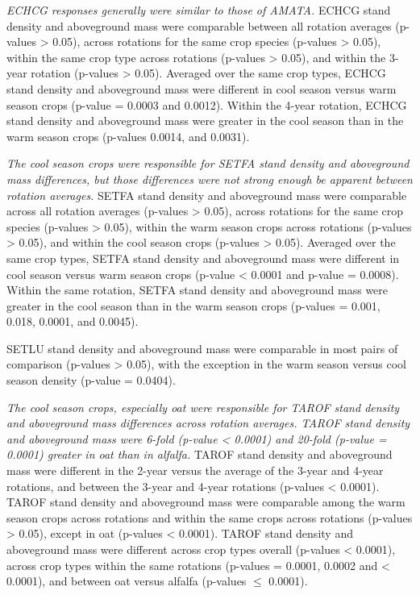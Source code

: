 \documentclass[
]{article}
\begin{document}
\emph{ECHCG responses generally were similar to those of AMATA.} ECHCG stand density and aboveground mass were comparable between all rotation averages (p-values \textgreater{} 0.05), across rotations for the same crop species (p-values \textgreater{} 0.05), within the same crop type across rotations (p-values \textgreater{} 0.05), and within the 3-year rotation (p-values \textgreater{} 0.05). Averaged over the same crop types, ECHCG stand density and aboveground mass were different in cool season versus warm season crops (p-value = 0.0003 and 0.0012). Within the 4-year rotation, ECHCG stand density and aboveground mass were greater in the cool season than in the warm season crops (p-values 0.0014, and 0.0031).

\emph{The cool season crops were responsible for SETFA stand density and aboveground mass differences, but those differences were not strong enough be apparent between rotation averages.} SETFA stand density and aboveground mass were comparable across all rotation averages (p-values \textgreater{} 0.05), across rotations for the same crop species (p-values \textgreater{} 0.05), within the warm season crops across rotations (p-values \textgreater{} 0.05), and within the cool season crops (p-values \textgreater{} 0.05). Averaged over the same crop types, SETFA stand density and aboveground mass were different in cool season versus warm season crops (p-value \textless{} 0.0001 and p-value = 0.0008). Within the same rotation, SETFA stand density and aboveground mass were greater in the cool season than in the warm season crops (p-values = 0.001, 0.018, 0.0001, and 0.0045).

SETLU stand density and aboveground mass were comparable in most pairs of comparison (p-values \textgreater{} 0.05), with the exception in the warm season versus cool season density (p-value = 0.0404).

\emph{The cool season crops, especially oat were responsible for TAROF stand density and aboveground mass differences across rotation averages. TAROF stand density and aboveground mass were 6-fold (p-value \textless{} 0.0001) and 20-fold (p-value = 0.0001) greater in oat than in alfalfa.} TAROF stand density and aboveground mass were different in the 2-year versus the average of the 3-year and 4-year rotations, and between the 3-year and 4-year rotations (p-values \textless{} 0.0001). TAROF stand density and aboveground mass were comparable among the warm season crops across rotations and within the same crops across rotations (p-values \textgreater{} 0.05), except in oat (p-values \textless{} 0.0001). TAROF stand density and aboveground mass were different across crop types overall (p-values \textless{} 0.0001), across crop types within the same rotations (p-values = 0.0001, 0.0002 and \textless{} 0.0001), and between oat versus alfalfa (p-values \(\leq\) 0.0001).
\end{document}
